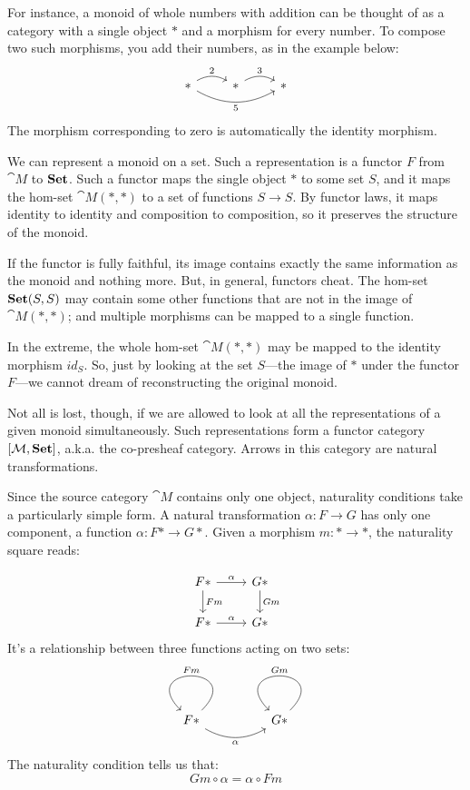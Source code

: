 \documentclass[DaoFP]{subfiles}
\begin{document}
For instance, a monoid of whole numbers with addition can be thought of as a category with a single object $*$ and a morphism for every number. To compose two such morphisms, you add their numbers, as in the example below:
\[
 \begin{tikzcd}
  *
  \arrow[r, bend left, "2"]
  \arrow[rr, bend right, "5"']
 & *
 \arrow[r, bend left, "3"]
 & *
  \end{tikzcd}
\]
The morphism corresponding to zero is automatically the identity morphism. 

We can represent a monoid on a set. Such a representation is a functor $F$ from $\cat M$ to $\mathbf{Set}$. Such a functor maps the single object $*$ to some set $S$, and it maps the hom-set $\cat M(*, *)$ to a set of functions $S \to S$. By functor laws, it maps identity to identity and composition to composition, so it preserves the structure of the monoid. 

If the functor is fully faithful, its image contains exactly the same information as the monoid and nothing more. But, in general, functors cheat. The hom-set $\mathbf{Set} (S, S)$ may contain some other functions that are not in the image of $\cat M(*, *)$; and multiple morphisms can be mapped to a single function. 

In the extreme, the whole hom-set $\cat M(*, *)$ may be mapped to the identity morphism $id_S$. So, just by looking at the set $S$---the image of $*$ under the functor $F$---we cannot dream of reconstructing the original monoid.

Not all is lost, though, if we are allowed to look at all the representations of a given monoid simultaneously. Such representations form a functor category $[\mathcal{M}, \mathbf{Set}]$, a.k.a. the co-presheaf category. Arrows in this category are natural transformations. 

Since the source category $\cat M$ contains only one object, naturality conditions take a particularly simple form. A natural transformation $\alpha \colon F \to G$ has only one component, a function $\alpha \colon F * \to G *$. Given a morphism $m \colon * \to *$, the naturality square reads:

\[
 \begin{tikzcd}
 F *
 \arrow[r, "\alpha"]
 \arrow[d, "F m"]
 & G *
  \arrow[d, "G m"]
\\
 F *
 \arrow[r, "\alpha"]
 & G *
 \end{tikzcd}
\]
It's a relationship between three functions acting on two sets:
\[
 \begin{tikzcd}
 F *
  \arrow[loop, "F m"']
  \arrow[rr, bend right, "\alpha"']
 && G *
  \arrow[loop, "G m"']
  \end{tikzcd}
\]
The naturality condition tells us that:
\[ G m \circ \alpha = \alpha \circ F m \]
\end{document}
